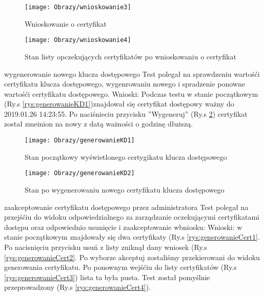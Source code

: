 \begin{enumerate*}
\begin{figure}[ht!]
		\begin{minipage}{0.2\textwidth}
		\texttt{[image: Obrazy/wnioskowanie3]}
		\caption{Wnioskowanie o certyfikat}
		\label{rys:wnioskowanie3}
	\end{minipage}
	\begin{minipage}{0.2\textwidth}
		\texttt{[image: Obrazy/wnioskowanie4]}
		\caption{Stan listy opczekujących certyfikatów po wnioskowaniu o certyfikat}
		\label{rys:wnioskowanie4}
	\end{minipage}
	\end{figure}
	
	
	
	
	\item wygenerowanie nowego klucza dostępowego\newline
	Test polegał na sprawdzeniu wartośći certyfikatu klucza dostępowego, wygenrowaniu nowego i spradzenie ponowne wartośći certyfikatu dostępowego.
	Wnioski: Podczas testu w stanie początkowym (Ry.s \ref{rys:generowanieKD1})znajdował się certyfikat dostępowy ważny do 2019.01.26 14:23:55. Po naciśnieciu przycisku ''Wygeneruj''  (Ry.s \ref{rys:generowanieKD2}) certyfikat został zmeinion na nowy z datą ważności o godzinę dłuższą.
 
	
	\begin{figure}[ht!]
		
		\begin{minipage}{0.4\textwidth}
			\texttt{[image: Obrazy/generowanieKD1]}
			\caption{Stan początkowy wyświetlonego certygikatu klucza dostępowego }
			\label{rys:generowanieKD1}
		\end{minipage}
		\begin{minipage}{0.4\textwidth}
			\texttt{[image: Obrazy/generowanieKD2]}
			\caption{Stan po wygenerowaniu nowego certyfikatu klucza dostępowego}
			\label{rys:generowanieKD2}
		\end{minipage}
		
	
	\end{figure}
	
	
	\item  zaakceptowanie certyfikatu dostępowego przez administratora
	Test polegał na przejśćiu do widoku odpowiedzialnego za zarządzanie oczekującymi certyfikatami dostępu oraz odpowiednio usunięcie i zaakceptowanie wbniosku:
	Wnioski: w stanie początkowym znajdowały się dwa certyfikaty (Ry.s \ref{rys:generowanieCert1}. Po nacisnięciu przycisku usuń z listy zniknął dany wniosek (Ry.s \ref{rys:generowanieCert2}. Po wyborze akceptuj zostaliśmy przekierowani do widoku generowania certyfikatu. Po ponownym wejśćiu do listy certyfikatów (Ry.s \ref{rys:generowanieCert3}) lista ta była pusta. Test został pomyślnie przeprowadzony (Ry.s \ref{rys:generowanieCert4}). 
	

\end{enumerate*}
